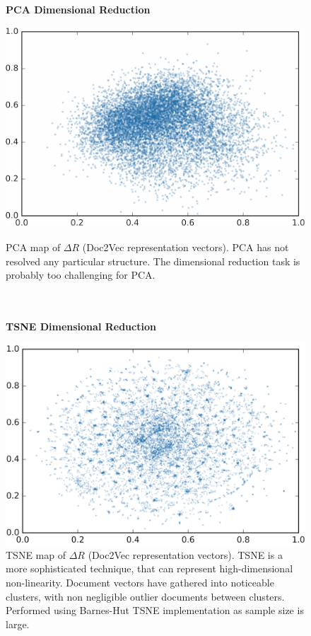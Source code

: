 \begin{figure}[H]
  \centering
  \begin{minipage}[b]{0.49\textwidth}
	\begin{center}\textbf{PCA Dimensional Reduction}\end{center}
    \includegraphics[width=\textwidth]{Validation/pca2.png}
    \caption[PCA Dimensional Reduction]{PCA map of $\Delta R$ (Doc2Vec representation vectors). PCA has not resolved any particular structure. The dimensional reduction task is probably too challenging for PCA.\\ \\ \\}
      \label{fig:PCA_snap}
  \end{minipage}
  \hfill
  \begin{minipage}[b]{0.49\textwidth}
  \begin{center}\textbf{TSNE Dimensional Reduction}\end{center}
    \includegraphics[width=\textwidth]{Validation/tsne2.png}
    \caption[TSNE Dimensional Reduction]{TSNE map of  $\Delta R$ (Doc2Vec representation vectors). TSNE is a more sophisticated technique, that can represent high-dimensional non-linearity. Document vectors have gathered into noticeable clusters, with non negligible outlier documents between clusters. Performed using Barnes-Hut TSNE implementation as sample size is large.}
      \label{fig:TSNE_snap}

  \end{minipage}
\end{figure}
